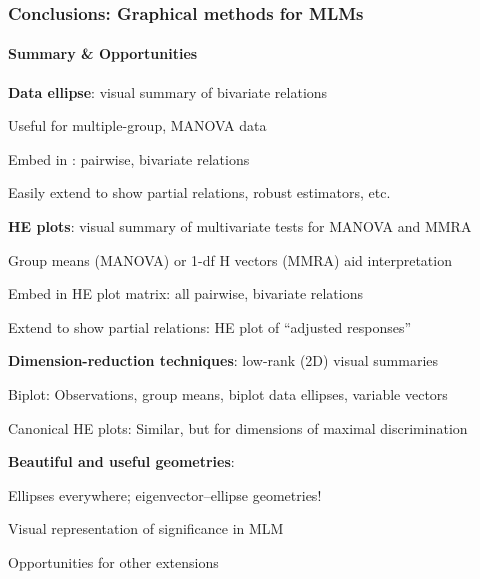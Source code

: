 \begin{frame}
  \frametitle{Conclusions: Graphical methods for MLMs}
  \framesubtitle{Summary \& Opportunities}
	\begin{itemize*}
	 \item<1-> {\bfseries Data ellipse}:  visual summary of bivariate relations
    	\begin{itemize*}
		\item Useful for multiple-group, MANOVA data
		\item Embed in \scatmat{}: pairwise, bivariate relations
		\item Easily extend to show partial relations, robust estimators, etc.
		\end{itemize*}
	  \item<2-> {\bfseries HE plots}: visual summary of multivariate tests for MANOVA and MMRA
    	\begin{itemize*}
		\item Group means (MANOVA) or 1-df H vectors (MMRA) aid interpretation
		\item Embed in HE plot matrix: all pairwise, bivariate relations
		\item Extend to show partial relations: HE plot of ``adjusted responses''
		\end{itemize*}

	 \item<3-> {\bfseries Dimension-reduction techniques}:  low-rank (2D) visual summaries
    	\begin{itemize*}
		\item Biplot:  Observations, group means, biplot data ellipses, variable vectors
		\item Canonical HE plots:  Similar, but for dimensions of maximal discrimination
		\end{itemize*}
	 \item<4-> {\bfseries Beautiful and useful geometries}:
    	\begin{itemize*}
		\item Ellipses everywhere; eigenvector--ellipse geometries!
		\item Visual representation of significance in MLM
		\item Opportunities for other extensions
		\end{itemize*}
	\end{itemize*}
\end{frame}

